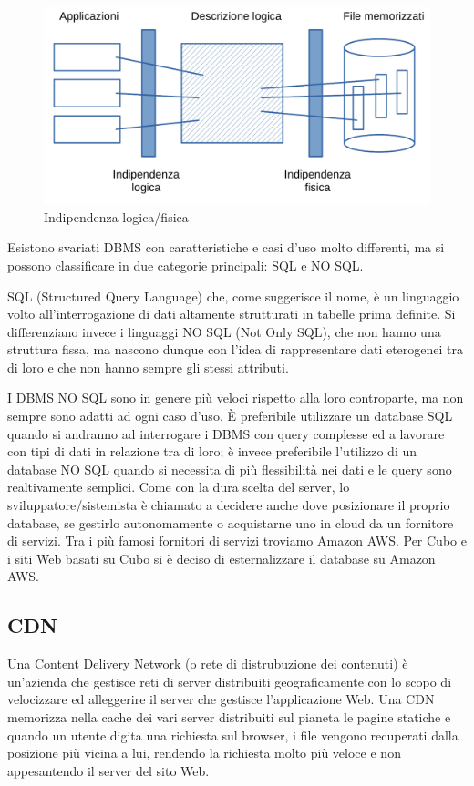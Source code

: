 \documentclass[12pt,a4paper]{article}
\begin{document}
\begin{figure}[H]
    \centering
    \includegraphics[width=.9\linewidth]{indipendenza_logica_fisica.png}
    \caption{Indipendenza logica/fisica}
\end{figure}

Esistono svariati DBMS con caratteristiche e casi d’uso molto differenti, ma si possono classificare in due categorie principali: SQL e NO SQL.

SQL (Structured Query Language) che, come suggerisce il nome, è un linguaggio volto all’interrogazione di dati altamente strutturati in tabelle prima definite.
Si differenziano invece i linguaggi NO SQL (Not Only SQL), che non hanno una struttura fissa, ma nascono dunque con l’idea di rappresentare dati eterogenei tra di loro e che non hanno sempre gli stessi attributi.

I DBMS NO SQL sono in genere più veloci rispetto alla loro controparte, ma non sempre sono adatti ad ogni caso d’uso. È preferibile utilizzare un database SQL quando si andranno ad interrogare i DBMS con query complesse ed a lavorare con tipi di dati in relazione tra di loro; è invece preferibile l’utilizzo di un database NO SQL quando si necessita di più flessibilità nei dati e le query sono realtivamente semplici.
Come con la dura scelta del server, lo sviluppatore/sistemista è chiamato a decidere anche dove posizionare il proprio database, se gestirlo autonomamente o acquistarne uno in cloud da un fornitore di servizi. Tra i più famosi fornitori di servizi troviamo Amazon AWS. Per Cubo e i siti Web basati su Cubo si è deciso di esternalizzare il database su Amazon AWS.
%
\subsection{CDN}
Una Content Delivery Network (o rete di distrubuzione dei contenuti) è un'azienda che gestisce reti di server distribuiti geograficamente con lo scopo di velocizzare ed alleggerire il server che gestisce l'applicazione Web.
Una CDN memorizza nella cache dei vari server distribuiti sul pianeta le pagine statiche e quando un utente digita una richiesta sul browser, i file vengono recuperati dalla posizione più vicina a lui, rendendo la richiesta molto più veloce e non appesantendo il server del sito Web.
%
\end{document}
